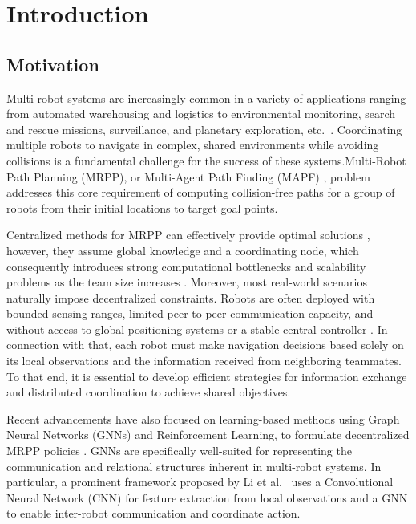 \chapter{Introduction}
\label{chap:introduction}
\section{Motivation}
Multi-robot systems are increasingly common in a variety of applications ranging from automated warehousing and logistics \cite{Wurman2008} to environmental monitoring, search and rescue missions, surveillance, and planetary exploration, etc.\ \cite{Parker2008}. 
Coordinating multiple robots to navigate in complex, shared environments while avoiding collisions is a fundamental challenge for the success of these systems.Multi-Robot Path Planning (MRPP), or Multi-Agent Path Finding (MAPF) \cite{Stern2019MAPFSurvey}, problem addresses this core requirement of computing collision-free paths for a group of robots from their initial locations to target goal points.

Centralized methods for MRPP can effectively provide optimal solutions \cite{Sharon2015CBS}, however, they assume global knowledge and a coordinating node, which consequently introduces strong computational bottlenecks and scalability problems as the team size increases \cite{Standley2011Complete}. Moreover, most real-world scenarios naturally impose decentralized constraints. Robots are often deployed with bounded sensing ranges, limited peer-to-peer communication capacity, and without access to global positioning systems or a stable central controller \cite{Li2021GNNCoordination, VanDenBerg2008ORCA}. In connection with that, each robot must make navigation decisions based solely on its local observations and the information received from neighboring teammates. To that end, it is essential to develop efficient strategies for information exchange and distributed coordination to achieve shared objectives.

Recent advancements have also focused on learning-based methods using Graph Neural Networks (GNNs) and Reinforcement Learning, to formulate decentralized MRPP policies \cite{Li2021GNNCoordination, Tolstay2020LearningDecentralized}. GNNs are specifically well-suited for representing the communication and relational structures inherent in multi-robot systems. In particular, a prominent framework proposed by Li et al.\ \cite{Li2021GNNCoordination} uses a Convolutional Neural Network (CNN) for feature extraction from local observations and a GNN to enable inter-robot communication and coordinate action.


